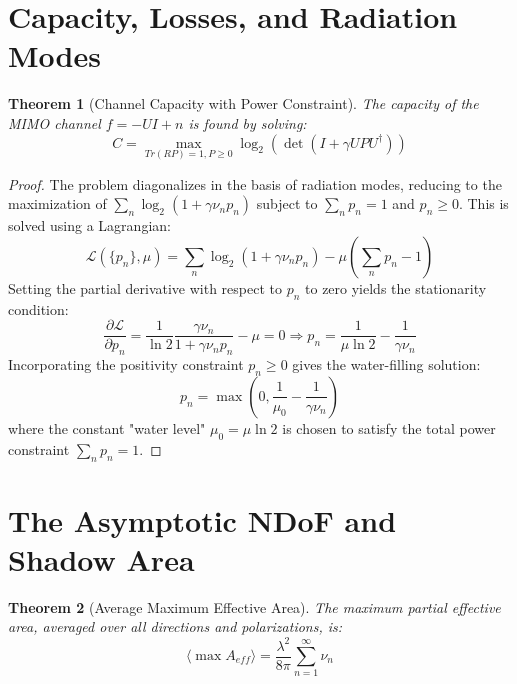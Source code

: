 \documentclass[11pt,a4paper]{article}
\newcommand{\herm}{\dagger} %
\newcommand{\avg}[1]{\langle #1 \rangle} %
\newtheorem{theorem}{Theorem}[section]
\begin{document}
\section{Capacity, Losses, and Radiation Modes}

\begin{theorem}[Channel Capacity with Power Constraint]
The capacity of the MIMO channel \(f=-UI+n\) is found by solving:
\begin{equation}
    C=\max_{Tr(RP)=1,P\ge0}\log_{2}(\det(I+\gamma UPU^{\herm}))
\end{equation}
\end{theorem}

\begin{proof}
The problem diagonalizes in the basis of radiation modes, reducing to the maximization of \(\sum_{n}\log_{2}(1+\gamma\nu_{n}p_{n})\) subject to \(\sum_{n}p_{n}=1\) and \(p_{n}\ge0\). This is solved using a Lagrangian:
\begin{equation}
    \mathcal{L}(\{p_{n}\},\mu)=\sum_{n}\log_{2}(1+\gamma\nu_{n}p_{n})-\mu\left(\sum_{n}p_{n}-1\right)
\end{equation}
Setting the partial derivative with respect to \(p_{n}\) to zero yields the stationarity condition:
\begin{equation}
    \frac{\partial\mathcal{L}}{\partial p_{n}}=\frac{1}{\ln 2}\frac{\gamma\nu_{n}}{1+\gamma\nu_{n}p_{n}}-\mu=0 \Rightarrow p_{n}=\frac{1}{\mu \ln 2}-\frac{1}{\gamma\nu_{n}}
\end{equation}
Incorporating the positivity constraint \(p_{n}\ge0\) gives the water-filling solution:
\begin{equation}
    p_{n}=\max\left(0,\frac{1}{\mu_{0}}-\frac{1}{\gamma\nu_{n}}\right)
\end{equation}
where the constant "water level" \(\mu_{0}=\mu \ln 2\) is chosen to satisfy the total power constraint \(\sum_{n}p_{n}=1\).
\end{proof}

\section{The Asymptotic NDoF and Shadow Area}

\begin{theorem}[Average Maximum Effective Area]
The maximum partial effective area, averaged over all directions and polarizations, is:
\begin{equation}
    \avg{\max A_{eff}}=\frac{\lambda^{2}}{8\pi}\sum_{n=1}^{\infty}\nu_{n}
\end{equation}
\end{theorem}
\end{document}
